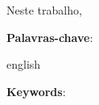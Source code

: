 \documentclass[
	article,			%
	11pt,				%
	oneside,			%
	a4paper,			%
	english,			%
	brazil,				%
	sumario=tradicional
	]{abntex2}
\begin{document}
\frenchspacing


%
%
\maketitle

\begin{resumoumacoluna}
Neste trabalho, %

 \vspace{\onelineskip}

 \noindent
 \textbf{Palavras-chave}: 
\end{resumoumacoluna}
\renewcommand{\resumoname}{Abstract}
\begin{resumoumacoluna}
 \begin{otherlanguage*}{english}






   \vspace{\onelineskip}

   \noindent
   \textbf{Keywords}: 
 \end{otherlanguage*}
\end{resumoumacoluna}



\textual



\newpage






%

%
\end{document}
